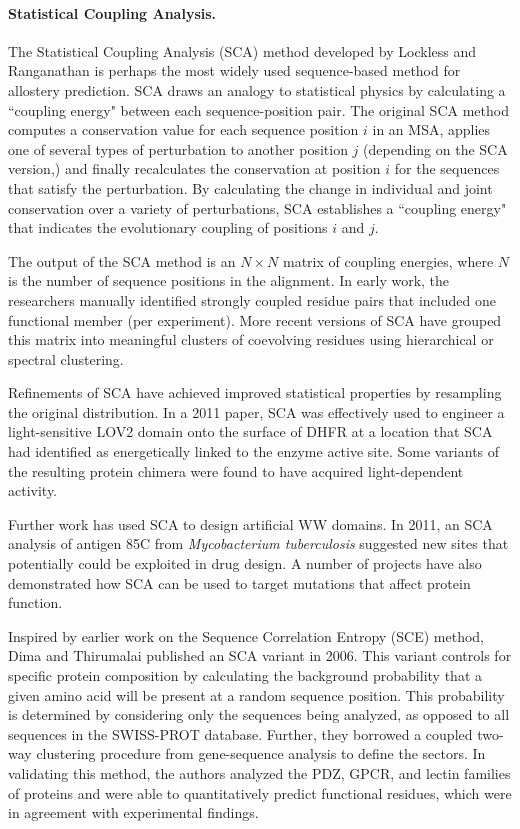 \paragraph{Statistical Coupling Analysis.} The Statistical Coupling Analysis (SCA) method developed by Lockless and Ranganathan is perhaps the most widely used sequence-based method for allostery prediction.\cite{Lockless1999} SCA draws an analogy to statistical physics by calculating a ``coupling energy" between each sequence-position pair. The original SCA method computes a conservation value for each sequence position $i$ in an MSA, applies one of several types of perturbation to another position $j$ (depending on the SCA version,\cite{Ranganathan2012}) and finally recalculates the conservation at position $i$ for the sequences that satisfy the perturbation. By calculating the change in individual and joint conservation over a variety of perturbations, SCA establishes a ``coupling energy" that indicates the evolutionary coupling of positions $i$ and $j$.
\par The output of the SCA method is an $N\times N$ matrix of coupling energies, where $N$ is the number of sequence positions in the alignment. In early work, the researchers manually identified strongly coupled residue pairs that included one functional member (per experiment). More recent versions of SCA have grouped this matrix into meaningful clusters of coevolving residues using hierarchical or spectral clustering.\cite{Suel2003a}
\par Refinements of SCA have achieved improved statistical properties by resampling the original distribution.\cite{Halabi2009a} In a 2011 paper, SCA was effectively used to engineer a light-sensitive LOV2 domain onto the surface of DHFR at a location that SCA had identified as energetically linked to the enzyme active site. Some variants of the resulting protein chimera were found to have acquired light-dependent activity.\cite{Reynolds2011a}
\par Further work has used SCA to design artificial WW domains.\cite{Russ2005a,Socolich2005a} In 2011, an SCA analysis of antigen 85C from \textit{Mycobacterium tuberculosis} suggested new sites that potentially could be exploited in drug design.\cite{Baths2011a} A number of projects have also demonstrated how SCA can be used to target mutations that affect protein function.\cite{McLaughlin2012a,Peterson2004a,Hatley2003a,Shulman2004a,Smock2010a,Chi2008a,Fuentes2004}
\par Inspired by earlier work on the Sequence Correlation Entropy (SCE) method,\cite{Dima2004a} Dima and Thirumalai published an SCA variant in 2006.\cite{Dima2006a} This variant controls for specific protein composition by calculating the background probability that a given amino acid will be present at a random sequence position. This probability is determined by considering only the sequences being analyzed, as opposed to all sequences in the SWISS-PROT database.\cite{ODonovan2002a,Boeckmann2003a} Further, they borrowed a coupled two-way clustering procedure from gene-sequence analysis to define the sectors.\cite{Getz2000a} In validating this method, the authors analyzed the PDZ, GPCR, and lectin families of proteins and were able to quantitatively predict functional residues, which were in agreement with experimental findings.
